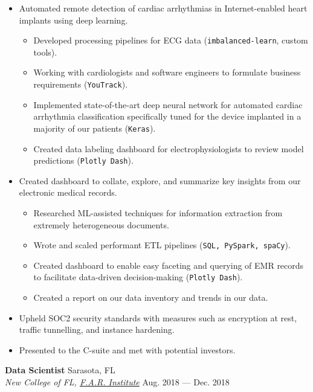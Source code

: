 \documentclass[a4paper,12pt]{article}
\newcommand{\ressubheading}[4]{{\begin{minipage}{\textwidth}
                                    \textbf{#1} \hfill #2 \\
                                    \textit{#3} \hfill #4 \\
\end{minipage}}}
\begin{document}
    \begin{itemize}

        \item  Automated remote detection of cardiac arrhythmias in Internet-enabled heart implants using deep learning.
        \begin{itemize}
            \item Developed processing pipelines for ECG data (\texttt{imbalanced-learn}, custom tools).
            \item Working with cardiologists and software engineers to formulate business requirements (\texttt{YouTrack}).
            \item Implemented state-of-the-art deep neural network for automated cardiac arrhythmia classification specifically tuned for the device implanted in a majority of our patients (\texttt{Keras}).
            \item Created data labeling dashboard for electrophysiologists to review model predictions (\texttt{Plotly Dash}).
        \end{itemize}

        \item Created dashboard to collate, explore, and summarize key insights from our electronic medical records.
        \begin{itemize}
            \item Researched ML-assisted techniques for information extraction from extremely heterogeneous documents.
            \item Wrote and scaled performant ETL pipelines (\texttt{SQL, PySpark, spaCy}).
            \item Created dashboard to enable easy faceting and querying of EMR records to facilitate data-driven decision-making (\texttt{Plotly Dash}).
            \item Created a report on our data inventory and trends in our data.
        \end{itemize}


        \item Upheld SOC2 security standards with measures such as encryption at rest, traffic tunnelling, and instance hardening.
        \item Presented to the C-suite and met with potential investors.

    \end{itemize}


    \ressubheading{Data Scientist}{Sarasota, FL}{New College of FL, \href{farinstitute.org}{F.A.R. Institute}}{Aug. 2018 --- Dec. 2018}
\end{document}
